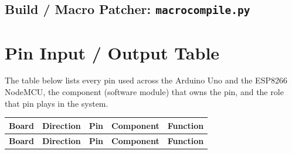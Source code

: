 \documentclass[11pt]{article}
\begin{document}
\subsection{Build / Macro Patcher: \texttt{macrocompile.py}}


\section{Pin Input / Output Table}

The table below lists every pin used across the Arduino Uno and the
ESP8266 NodeMCU, the component (software module) that owns the pin, and
the role that pin plays in the system.

\begin{longtable}{>{\raggedright\arraybackslash}p{}
                  >{\raggedright\arraybackslash}p{}
                  >{\raggedright\arraybackslash}p{}
                  >{\raggedright\arraybackslash}p{}
                  >{\raggedright\arraybackslash}p{}}
\toprule
\textbf{Board} & \textbf{Direction} & \textbf{Pin} & \textbf{Component} & \textbf{Function} \\
\midrule
\endfirsthead

\toprule
\textbf{Board} & \textbf{Direction} & \textbf{Pin} & \textbf{Component} & \textbf{Function} \\
\midrule
\endhead


\end{longtable}
\end{document}
